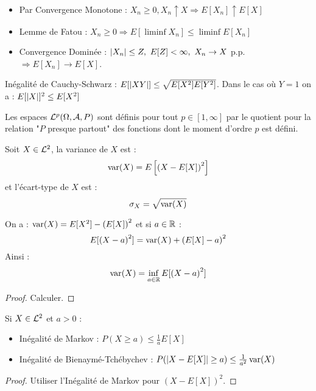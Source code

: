 \documentclass{cours}
\begin{document}
    \begin{proposition}
        \begin{itemize}
            \item Par Convergence Monotone : $X_{n} \geq 0, X_{n} \uparrow X \Rightarrow E[X_{n}] \uparrow E[X]$
            \item Lemme de Fatou : $X_{n} \geq 0 \Rightarrow E[\liminf X_{n}] \leq \liminf E[X_{n}]$ 
            \item Convergence Dominée : $\left|X_{n}\right| \leq Z, \ E[Z] < \infty, \ X_{n} \rightarrow X$ p.p. $\Rightarrow E[X_{n}] \rightarrow E[X]$.
        \end{itemize}
    \end{proposition}

    \begin{proposition}
        Inégalité de Cauchy-Schwarz : $E[\left|XY\right|] \leq \sqrt{E[X^{2}]E[Y^{2}]}$. Dans le cas où $Y = 1$ on a : $E[\left|X\right|]^{2} \leq E[X^{2}]$
    \end{proposition}

    Les espaces $\mathcal{L}^{p}(\Omega, \mathcal{A}, P)$ sont définis pour tout $p \in \left[1, \infty\right]$ par le quotient pour la relation "$P$ presque partout" des fonctions dont le moment d'ordre $p$ est défini. 

    \begin{definition}
        Soit $X \in \mathcal{L}^{2}$, la variance de $X$ est : 
        \[
            \operatorname{var}(X) = E\left[\left(X - E[X]\right)^{2}\right]
        \]
        et l'écart-type de $X$ est :
        \[
            \sigma_{X} = \sqrt{\operatorname{var}(X)}  
        \]
    \end{definition}

    \begin{proposition}
        On a : $\operatorname{var}(X) = E[X^{2}] - \left(E[X]\right)^{2}$ et si $a \in \mathbb{R}$ : 
        \[
            E[\left(X - a\right)^{2}] = \operatorname{var}(X) + \left(E[X] - a\right)^{2}
        \]
        Ainsi : 
        \[
            \operatorname{var}(X) = \inf_{a\in \mathbb{R}} E[\left(X - a\right)^{2}]
        \]
    \end{proposition}
    \begin{proof}
        Calculer.
    \end{proof}


    \begin{proposition}
        Si $X \in \mathcal{L}^{2}$ et $a > 0$ : 
        \begin{itemize}
            \item Inégalité de Markov : $P(X \geq a) \leq \frac{1}{a}E[X]$
            \item Inégalité de Bienaymé-Tchébychev : $P(\left|X - E[X]\right| \geq a) \leq \frac{1}{a^{2}}\operatorname{var}(X)$
        \end{itemize}
    \end{proposition}
    \begin{proof}
        Utiliser l'Inégalité de Markov pour $\left(X - E[X]\right)^{2}$. 
    \end{proof}
\end{document}
